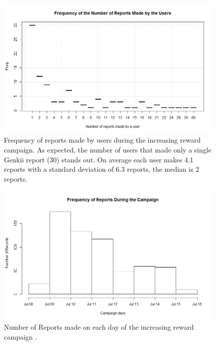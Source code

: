 \documentclass[letterpaper]{article}
\begin{document}
\begin{figure}[htb]
	\begin{center}
		\includegraphics[width=1\linewidth]{images/FrequencyNumberReports_I}
		\caption{Frequency of reports made by users during the increasing reward campaign. As expected, the number of users that made only a single Genkii report (30) stands out. On average each user makes 4.1 reports with a standard deviation of 6.3 reports, the median is 2 reports.\label{fig:freqreports2}}
	\end{center}
\end{figure}

\begin{figure}[htb]
	\begin{center}
		\includegraphics[width=1\linewidth]{images/RPerDay_I}
		\caption{Number of Reports made on each day of the increasing reward campaign .\label{fig:freqreportsperday1}}
	\end{center}
\end{figure}
\end{document}
